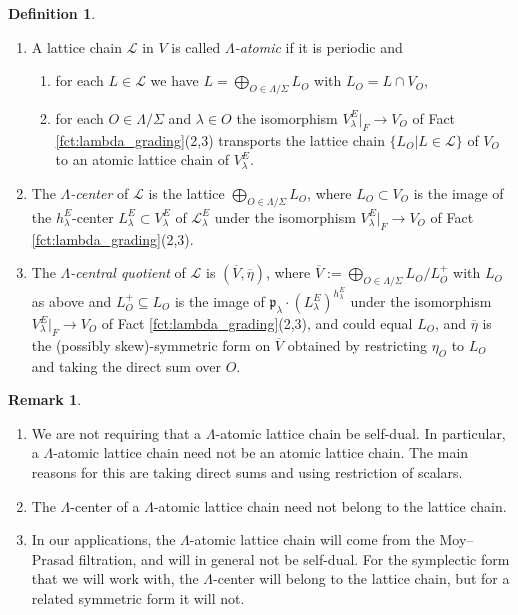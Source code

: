 \documentclass{article}
\def\mf#1{\mathfrak{#1}}
\def\mc#1{\mathcal{#1}}
\def\ol#1{\overline{#1}}
\theoremstyle{definition}
\newtheorem{rem}[thm]{Remark}
\newtheorem{dfn}[thm]{Definition}
\numberwithin{equation}{subsection}
\renewcommand{\-}{\hyp{}}
\begin{document}
\begin{dfn} \label{dfn:lambda_atomic}
\begin{enumerate}
		\item A lattice chain $\mc{L}$ in $V$ is called \emph{$\Lambda$-atomic} if it is periodic and
	\begin{enumerate}
		\item for each $L \in \mc{L}$ we have $L=\bigoplus_{O \in \Lambda/\Sigma} L_O$ with $L_O = L \cap V_O$,
		\item for each $O \in \Lambda/\Sigma$ and $\lambda \in O$ the isomorphism $V_\lambda^E|_F \to V_O$ of Fact \ref{fct:lambda_grading}(2,3) transports the lattice chain $\{L_O|L \in \mc{L}\}$ of $V_O$ to an atomic lattice chain of $V_\lambda^E$.
	\end{enumerate}
	\item The \emph{$\Lambda$-center} of $\mc{L}$ is the lattice $\bigoplus_{O \in \Lambda/\Sigma} L_O$,
	where $L_O \subset V_O$ is the image of the $h_\lambda^E$-center $L_\lambda^E \subset V_\lambda^E$ of $\mc{L}_\lambda^E$ under the isomorphism $V_\lambda^E|_F \to V_O$ of Fact \ref{fct:lambda_grading}(2,3).
	\item The \emph{$\Lambda$-central quotient} of $\mc{L}$ is $(\ol{V},\ol{\eta})$, where $\ol{V}:=\bigoplus_{O \in \Lambda/\Sigma} L_O/L_O^+$ with $L_O$ as above and $L_O^+ \subseteq L_O$ is the image of $\mf{p}_\lambda\cdot (L_\lambda^E)^{h_\lambda^E}$ under the isomorphism $V_\lambda^E|_F \to V_O$ of Fact \ref{fct:lambda_grading}(2,3), and could equal $L_O$, and $\ol{\eta}$ is the (possibly skew)-symmetric form on $\ol{V}$ obtained by restricting $\eta_O$ to $L_O$ and taking the direct sum over $O$.
	\end{enumerate}
\end{dfn}





\begin{rem}
	\begin{enumerate}
		\item We are not requiring that a $\Lambda$-atomic lattice chain be self-dual. In particular, a $\Lambda$-atomic lattice chain need not be an atomic lattice chain. The main reasons for this are taking direct sums and using restriction of scalars.
		\item The $\Lambda$-center of a $\Lambda$-atomic lattice chain need not belong to the lattice chain.
		\item In our applications, the $\Lambda$-atomic lattice chain will come from the Moy--Prasad filtration, and will in general not be self-dual. For the symplectic form that we will work with, the $\Lambda$-center will belong to the lattice chain, but for a related symmetric form it will not.
	\end{enumerate}
\end{rem}
\end{document}
